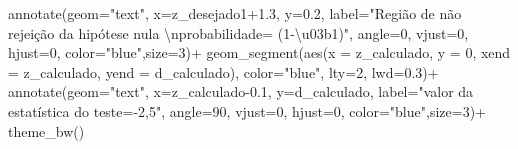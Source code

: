 \documentclass[
]{book}
\newenvironment{Shaded}{\begin{snugshade}}{\end{snugshade}}
\newcommand{\AttributeTok}[1]{\textcolor[rgb]{0.77,0.63,0.00}{#1}}
\newcommand{\DecValTok}[1]{\textcolor[rgb]{0.00,0.00,0.81}{#1}}
\newcommand{\FloatTok}[1]{\textcolor[rgb]{0.00,0.00,0.81}{#1}}
\newcommand{\FunctionTok}[1]{\textcolor[rgb]{0.00,0.00,0.00}{#1}}
\newcommand{\NormalTok}[1]{#1}
\newcommand{\SpecialCharTok}[1]{\textcolor[rgb]{0.00,0.00,0.00}{#1}}
\newcommand{\StringTok}[1]{\textcolor[rgb]{0.31,0.60,0.02}{#1}}
\begin{document}
\begin{Shaded}
\begin{Highlighting}[]
  \FunctionTok{annotate}\NormalTok{(}\AttributeTok{geom=}\StringTok{"text"}\NormalTok{, }\AttributeTok{x=}\NormalTok{z\_desejado1}\FloatTok{+1.3}\NormalTok{, }\AttributeTok{y=}\FloatTok{0.2}\NormalTok{, }\AttributeTok{label=}\StringTok{"Região de não rejeição da hipótese nula }\SpecialCharTok{\textbackslash{}n}\StringTok{probabilidade= (1{-}\textbackslash{}u03b1)"}\NormalTok{, }\AttributeTok{angle=}\DecValTok{0}\NormalTok{, }\AttributeTok{vjust=}\DecValTok{0}\NormalTok{, }\AttributeTok{hjust=}\DecValTok{0}\NormalTok{, }\AttributeTok{color=}\StringTok{"blue"}\NormalTok{,}\AttributeTok{size=}\DecValTok{3}\NormalTok{)}\SpecialCharTok{+}
  \FunctionTok{geom\_segment}\NormalTok{(}\FunctionTok{aes}\NormalTok{(}\AttributeTok{x =}\NormalTok{ z\_calculado, }\AttributeTok{y =} \DecValTok{0}\NormalTok{, }\AttributeTok{xend =}\NormalTok{ z\_calculado, }\AttributeTok{yend =}\NormalTok{ d\_calculado), }\AttributeTok{color=}\StringTok{"blue"}\NormalTok{, }\AttributeTok{lty=}\DecValTok{2}\NormalTok{, }\AttributeTok{lwd=}\FloatTok{0.3}\NormalTok{)}\SpecialCharTok{+}
  \FunctionTok{annotate}\NormalTok{(}\AttributeTok{geom=}\StringTok{"text"}\NormalTok{, }\AttributeTok{x=}\NormalTok{z\_calculado}\FloatTok{{-}0.1}\NormalTok{, }\AttributeTok{y=}\NormalTok{d\_calculado, }\AttributeTok{label=}\StringTok{"valor da estatística do teste={-}2,5"}\NormalTok{, }\AttributeTok{angle=}\DecValTok{90}\NormalTok{, }\AttributeTok{vjust=}\DecValTok{0}\NormalTok{, }\AttributeTok{hjust=}\DecValTok{0}\NormalTok{, }\AttributeTok{color=}\StringTok{"blue"}\NormalTok{,}\AttributeTok{size=}\DecValTok{3}\NormalTok{)}\SpecialCharTok{+}
  \FunctionTok{theme\_bw}\NormalTok{()}
\end{Highlighting}
\end{Shaded}
\end{document}
